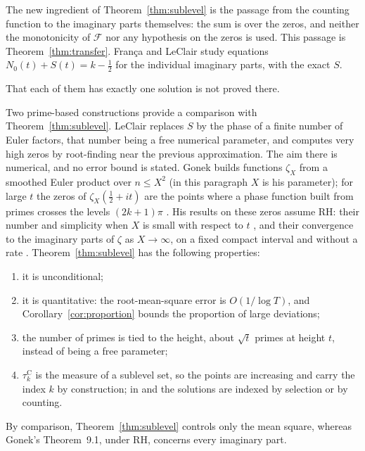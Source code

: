 \documentclass[11pt,a4paper]{article}
\makeatletter
\numberwithin{equation}{section}
\DeclareRobustCommand{\CGref}[1]{\ref{#1}}
\DeclareRobustCommand{\CGcite}[2][]{\if\relax\detokenize{#1}\relax\cite{#2}\else\cite[#1]{#2}\fi}
\let\CG@origref\ref
\newcommand{\CG@gettip}[1]{\@ifundefined{CGTip@#1}{#1}{\csname CGTip@#1\endcsname}}
\newcommand{\CG@getbib}[1]{\@ifundefined{CGBib@#1}{#1}{\csname CGBib@#1\endcsname}}
\DeclareRobustCommand{\CGref}[1]{\pdftooltip{\CG@origref{#1}}{\CG@gettip{#1}}}
\DeclareRobustCommand{\CGcite}[2][]{\pdftooltip{\if\relax\detokenize{#1}\relax\cite{#2}\else\cite[#1]{#2}\fi}{\CG@getbib{#2}}}
\theoremstyle{definition}
\theoremstyle{remark}
\newcommand{\Nz}{N_0} %
\newcommand{\Fc}{\mathcal F}
\makeatother
\begin{document}
The new ingredient of Theorem~\CGref{thm:sublevel} is the passage from the counting function to the imaginary parts themselves: the sum is over the zeros, and neither the monotonicity of $\Fc$ nor any hypothesis on the zeros is used. This passage is Theorem~\CGref{thm:transfer}. Fran\c{c}a and LeClair \CGcite{FrancaLeClair2015} study equations $\Nz(t)+S(t)=k-\frac12$ for the individual imaginary parts, with the exact $S$.

That each of them has exactly one solution is not proved there.

Two prime-based constructions provide a comparison with Theorem~\CGref{thm:sublevel}. LeClair \CGcite[\S VI, eq.~(49)]{LeClair2016} replaces $S$ by the phase of a finite number of Euler factors, that number being a free numerical parameter, and computes very high zeros by root-finding near the previous approximation. The aim there is numerical, and no error bound is stated. Gonek \CGcite{Gonek2012} builds functions $\zeta_X$ from a smoothed Euler product over $n\le X^2$ (in this paragraph $X$ is his parameter); for large $t$ the zeros of $\zeta_X(\frac12+it)$ are the points where a phase function built from primes crosses the levels $(2k+1)\pi$ \CGcite[\S10]{Gonek2012}. His results on these zeros assume RH: their number and simplicity when $X$ is small with respect to $t$ \CGcite[Thm.~8.1]{Gonek2012}, and their convergence to the imaginary parts of $\zeta$ as $X\to\infty$, on a fixed compact interval and without a rate \CGcite[Thm.~9.1]{Gonek2012}. Theorem~\CGref{thm:sublevel} has the following properties:
\begin{enumerate}
\item it is unconditional;
\item it is quantitative: the root-mean-square error is $O(1/\log T)$, and Corollary~\CGref{cor:proportion} bounds the proportion of large deviations;
\item the number of primes is tied to the height, about $\sqrt t$ primes at height $t$, instead of being a free parameter;
\item $\tau_{k}^{\mathrm C}$ is the measure of a sublevel set, so the points are increasing and carry the index $k$ by construction; in \CGcite{LeClair2016} and \CGcite{Gonek2012} the solutions are indexed by selection or by counting.
\end{enumerate}
By comparison, Theorem~\CGref{thm:sublevel} controls only the mean square, whereas Gonek's Theorem~9.1, under RH, concerns every imaginary part.
\end{document}
